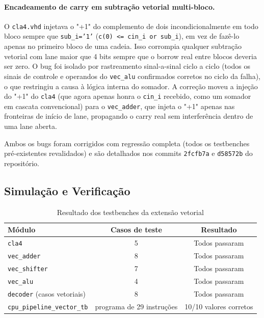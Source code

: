 \documentclass[12pt, a4paper]{article}
\newcommand{\code}[1]{\texttt{#1}}
\begin{document}
\paragraph{Encadeamento de carry em subtração vetorial multi-bloco.} O
\code{cla4.vhd} injetava o "+1" do complemento de dois
incondicionalmente em todo bloco sempre que \code{sub\_i='1'}
(\code{c(0) <= cin\_i or sub\_i}), em vez de fazê-lo apenas no primeiro
bloco de uma cadeia. Isso corrompia qualquer subtração vetorial com lane
maior que 4 bits sempre que o borrow real entre blocos deveria ser zero.
O bug foi isolado por rastreamento sinal-a-sinal ciclo a ciclo (todos os
sinais de controle e operandos do \code{vec\_alu} confirmados corretos
no ciclo da falha), o que restringiu a causa à lógica interna do
somador. A correção moveu a injeção do "+1" do \code{cla4} (que agora
apenas honra o \code{cin\_i} recebido, como um somador em cascata
convencional) para o \code{vec\_adder}, que injeta o "+1" apenas nas
fronteiras de início de lane, propagando o carry real sem interferência
dentro de uma lane aberta.

Ambos os bugs foram corrigidos com regressão completa (todos os
testbenches pré-existentes revalidados) e são detalhados nos commits
\code{2fcfb7a} e \code{d58572b} do repositório.

\subsection{Simulação e Verificação}

\begin{table}[H]
  \centering
  \caption{Resultado dos testbenches da extensão vetorial}
  \small{}
  \begin{tabular}{lcc}
    \toprule
    \rowcolor{headerblue}
    \color{white}\textbf{Módulo} & \color{white}\textbf{Casos de teste} &
    \color{white}\textbf{Resultado} \\
    \midrule
    \code{cla4}                & 5  & Todos passaram \\
    \code{vec\_adder}          & 8  & Todos passaram \\
    \code{vec\_shifter}        & 7  & Todos passaram \\
    \code{vec\_alu}            & 4  & Todos passaram \\
    \code{decoder} (casos vetoriais) & 8 & Todos passaram \\
    \code{cpu\_pipeline\_vector\_tb} & programa de 29 instruções & 10/10 valores corretos \\
    \bottomrule
  \end{tabular}
\end{table}
\end{document}

